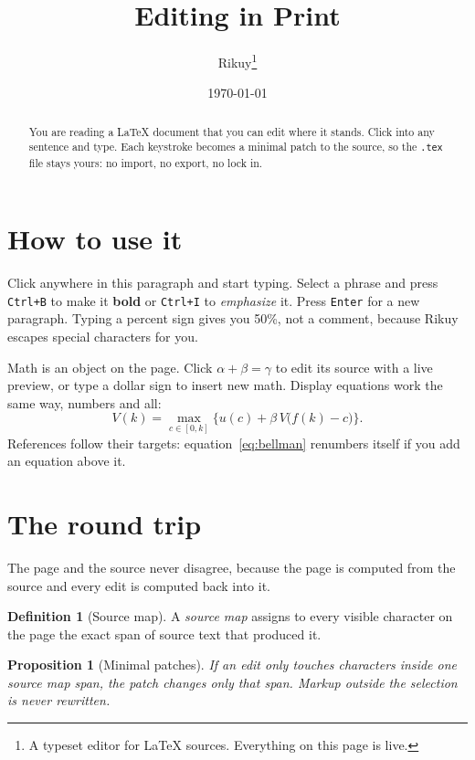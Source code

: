 \documentclass[11pt]{article}
\title{Editing in Print}
\author{Rikuy\thanks{A typeset editor for \LaTeX{} sources. Everything on this page is live.}}
\date{\today}
\newtheorem{proposition}{Proposition}
\theoremstyle{definition}
\newtheorem{definition}{Definition}
\newcommand{\key}[1]{\texttt{#1}}
\begin{document}
\maketitle

\begin{abstract}
You are reading a \LaTeX{} document that you can edit where it stands. Click into any sentence and type. Each keystroke becomes a minimal patch to the source, so the \texttt{.tex} file stays yours: no import, no export, no lock in.
\end{abstract}

\section{How to use it}
Click anywhere in this paragraph and start typing. Select a phrase and press \key{Ctrl+B} to make it \textbf{bold} or \key{Ctrl+I} to \emph{emphasize} it. Press \key{Enter} for a new paragraph. Typing a percent sign gives you 50\%, not a comment, because Rikuy escapes special characters for you.

Math is an object on the page. Click $\alpha + \beta = \gamma$ to edit its source with a live preview, or type a dollar sign to insert new math. Display equations work the same way, numbers and all:
\begin{equation}
  V(k) = \max_{c \in [0,k]} \bigl\{ u(c) + \beta\, V\bigl(f(k) - c\bigr) \bigr\}. \label{eq:bellman}
\end{equation}
References follow their targets: equation~\eqref{eq:bellman} renumbers itself if you add an equation above it.

\section{The round trip}\label{sec:roundtrip}
The page and the source never disagree, because the page is computed from the source and every edit is computed back into it.

\begin{definition}[Source map]
A \emph{source map} assigns to every visible character on the page the exact span of source text that produced it.
\end{definition}

\begin{proposition}[Minimal patches]\label{prop:patch}
If an edit only touches characters inside one source map span, the patch changes only that span. Markup outside the selection is never rewritten.
\end{proposition}
\end{document}
